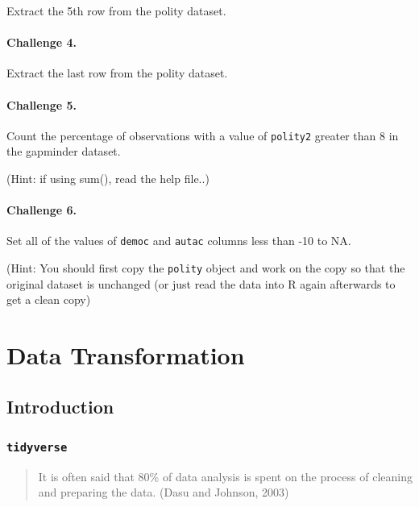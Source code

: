 \documentclass[]{book}
\begin{document}
Extract the 5th row from the polity dataset.

\subsubsection*{Challenge 4.}\label{challenge-4.-1}

Extract the last row from the polity dataset.

\subsubsection*{Challenge 5.}\label{challenge-5.}

Count the percentage of observations with a value of \texttt{polity2}
greater than 8 in the gapminder dataset.

(Hint: if using sum(), read the help file..)

\subsubsection*{Challenge 6.}\label{challenge-6.}

Set all of the values of \texttt{democ} and \texttt{autac} columns less
than -10 to NA.

(Hint: You should first copy the \texttt{polity} object and work on the
copy so that the original dataset is unchanged (or just read the data
into R again afterwards to get a clean copy)

\chapter{Data Transformation}\label{data-transformation}

\section{Introduction}\label{introduction-1}

\subsection{\texorpdfstring{\texttt{tidyverse}}{tidyverse}}\label{tidyverse}

\begin{quote}
It is often said that 80\% of data analysis is spent on the process of
cleaning and preparing the data. (Dasu and Johnson, 2003)
\end{quote}
\end{document}

